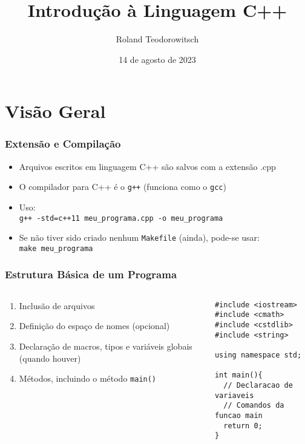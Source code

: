 \documentclass[aspectratio=169]{beamer}
\title[\sc{Introdução à Linguagem C++}]{Introdução à Linguagem C++}
\author[Roland Teodorowitsch]{Roland Teodorowitsch}
\institute[POO - EC - PUCRS]{Programação Orientada a Objetos - ECo - Curso de Engenharia de Computação - PUCRS}
\date{14 de agosto de 2023}
\begin{document}
\justifying

\begin{frame}
	\titlepage
\end{frame}

\section{Visão Geral}

\begin{frame}\frametitle{Extensão e Compilação}
\begin{itemize}
	\item Arquivos escritos em linguagem C++ são salvos com a extensão .cpp
	\item O compilador para C++ é o \texttt{g++} (funciona como o \texttt{gcc})
	\item Uso:\\\texttt{g++ -std=c++11 meu\_programa.cpp -o meu\_programa}
	\item Se não tiver sido criado nenhum \texttt{Makefile} (ainda), pode-se usar:\\\texttt{make meu\_programa}
\end{itemize}
\end{frame}

\begin{frame}[fragile]\frametitle{Estrutura Básica de um Programa}
\begin{columns}[T]
\begin{column}{0.5\linewidth}
\begin{enumerate}
	\item Inclusão de arquivos
	\item Definição do espaço de nomes (opcional)
	\item Declaração de macros, tipos e variáveis globais (quando houver)
	\item Métodos, incluindo o método \texttt{main()}
\end{enumerate}
\end{column}
\begin{column}{0.5\linewidth}
\begin{lstlisting}
#include <iostream>
#include <cmath>
#include <cstdlib>
#include <string>

using namespace std;

int main(){
  // Declaracao de variaveis
  // Comandos da funcao main
  return 0;
}
\end{lstlisting}
\end{column}
\end{columns}
\end{frame}
\end{document}
